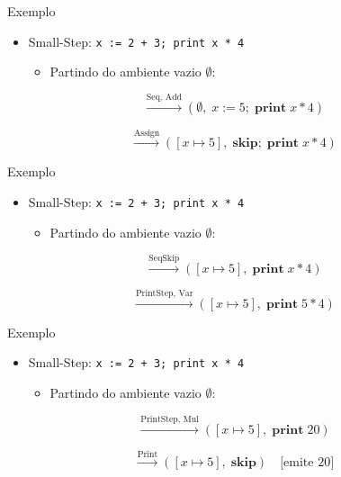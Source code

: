 \begin{frame}[fragile]{Exemplo}

    \begin{itemize}

        \item
        Small-Step: \texttt{x := 2 + 3; print x * 4}

        \begin{itemize}

            \item
            Partindo do ambiente vazio \(\emptyset\):
        \end{itemize}
    \end{itemize}

    \[\xrightarrow{\text{Seq, Add}} (\emptyset,\; x \mathbin{:=} 5;\; \mathbf{print}\; x*4)\]

    \[\xrightarrow{\text{Assign}} ([x \mapsto 5],\; \mathbf{skip};\; \mathbf{print}\; x*4)\]
\end{frame}

\begin{frame}[fragile]{Exemplo}

    \begin{itemize}

        \item
        Small-Step: \texttt{x := 2 + 3; print x * 4}

        \begin{itemize}

            \item
            Partindo do ambiente vazio \(\emptyset\):
        \end{itemize}
    \end{itemize}

    \[\xrightarrow{\text{SeqSkip}} ([x \mapsto 5],\; \mathbf{print}\; x*4)\]

    \[\xrightarrow{\text{PrintStep, Var}} ([x \mapsto 5],\; \mathbf{print}\; 5*4)\]
\end{frame}

\begin{frame}[fragile]{Exemplo}

    \begin{itemize}

        \item
        Small-Step: \texttt{x := 2 + 3; print x * 4}

        \begin{itemize}

            \item
            Partindo do ambiente vazio \(\emptyset\):
        \end{itemize}
    \end{itemize}

    \[\xrightarrow{\text{PrintStep, Mul}} ([x \mapsto 5],\; \mathbf{print}\; 20)\]

    \[\xrightarrow{\text{Print}} ([x \mapsto 5],\; \mathbf{skip}) \quad\text{[emite 20]}\]
\end{frame}



